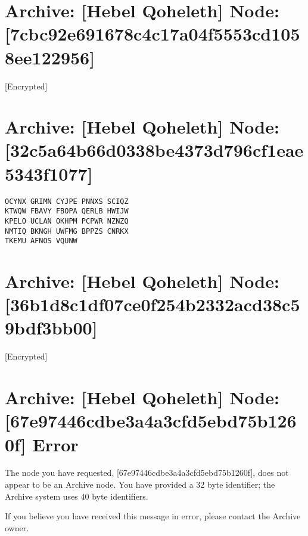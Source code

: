 \hypertarget{archive-hebel-qoheleth-node-7cbc92e691678c4c17a04f5553cd1058ee122956}{%
\section{Archive: {[}Hebel Qoheleth{]} \textbar{} Node: {[}7cbc92e691678c4c17a04f5553cd1058ee122956{]}}\label{archive-hebel-qoheleth-node-7cbc92e691678c4c17a04f5553cd1058ee122956}}

{[}Encrypted{]}

\hypertarget{archive-hebel-qoheleth-node-32c5a64b66d0338be4373d796cf1eae5343f1077}{%
\section{Archive: {[}Hebel Qoheleth{]} \textbar{} Node: {[}32c5a64b66d0338be4373d796cf1eae5343f1077{]}}\label{archive-hebel-qoheleth-node-32c5a64b66d0338be4373d796cf1eae5343f1077}}

\begin{verbatim}
OCYNX GRIMN CYJPE PNNXS SCIQZ
KTWQW FBAVY FBOPA QERLB HWIJW
KPELO UCLAN OKHPM PCPWR NZNZQ
NMTIQ BKNGH UWFMG BPPZS CNRKX
TKEMU AFNOS VQUNW
\end{verbatim}

\hypertarget{archive-hebel-qoheleth-node-36b1d8c1df07ce0f254b2332acd38c59bdf3bb00}{%
\section{Archive: {[}Hebel Qoheleth{]} \textbar{} Node: {[}36b1d8c1df07ce0f254b2332acd38c59bdf3bb00{]}}\label{archive-hebel-qoheleth-node-36b1d8c1df07ce0f254b2332acd38c59bdf3bb00}}

{[}Encrypted{]}

\hypertarget{archive-hebel-qoheleth-node-67e97446cdbe3a4a3cfd5ebd75b1260f-error}{%
\section{Archive: {[}Hebel Qoheleth{]} \textbar{} Node: {[}67e97446cdbe3a4a3cfd5ebd75b1260f{]} Error}\label{archive-hebel-qoheleth-node-67e97446cdbe3a4a3cfd5ebd75b1260f-error}}

The node you have requested, {[}67e97446cdbe3a4a3cfd5ebd75b1260f{]}, does not appear to be an Archive node. You have provided a 32 byte identifier; the Archive system uses 40 byte identifiers.

If you believe you have received this message in error, please contact the Archive owner.

